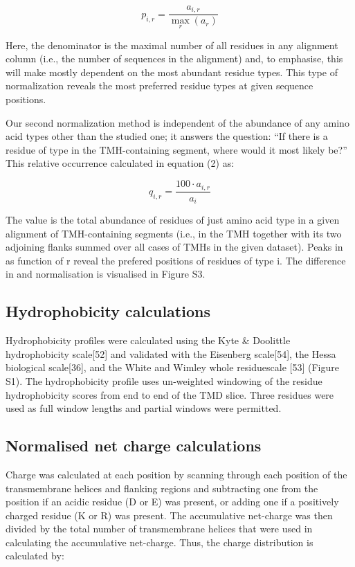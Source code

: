 \begin{equation}
  p_{i,r}=\frac{a_{i,r}}{\underset{r}{\max}{(a_r)}}
\end{equation}


Here, the denominator is the maximal number of all residues in any alignment column (i.e., the number of sequences in the alignment) and, to emphasise, this will make  mostly dependent on the most abundant residue types. This type of normalization reveals the most preferred residue types at given sequence positions.

Our second normalization method is independent of the abundance of any amino acid types other than the studied one; it answers the question: “If there is a residue of type  in the TMH-containing segment, where would it most likely be?” This relative occurrence  calculated in equation (2) as:

 \begin{equation}
   q_{i,r}=\frac{{100}\cdot{a_{i,r}}}{a_i}
 \end{equation}

The value  is the total abundance of residues of just amino acid type  in a given alignment of TMH-containing segments (i.e., in the TMH together with its two adjoining flanks summed over all cases of TMHs in the given dataset). Peaks in as function of r reveal the prefered positions of residues of type i. The difference in   and   normalisation is visualised in Figure S3.

\subsection{Hydrophobicity calculations}

Hydrophobicity profiles were calculated using the Kyte \& Doolittle hydrophobicity scale[52] and validated with the Eisenberg scale[54], the Hessa biological scale[36], and the White and Wimley whole residuescale [53] (Figure S1). The hydrophobicity profile uses un-weighted windowing of the residue hydrophobicity scores from end to end of the TMD slice. Three residues were used as full window lengths and partial windows were permitted.

\subsection{Normalised net charge calculations}

Charge was calculated at each position by scanning through each position of the transmembrane helices and flanking regions and subtracting one from the position if an acidic residue (D or E) was present, or adding one if a positively charged residue (K or R) was present. The accumulative net-charge  was then divided by the total number  of transmembrane helices that were used in calculating the accumulative net-charge. Thus, the charge distribution is calculated by:

